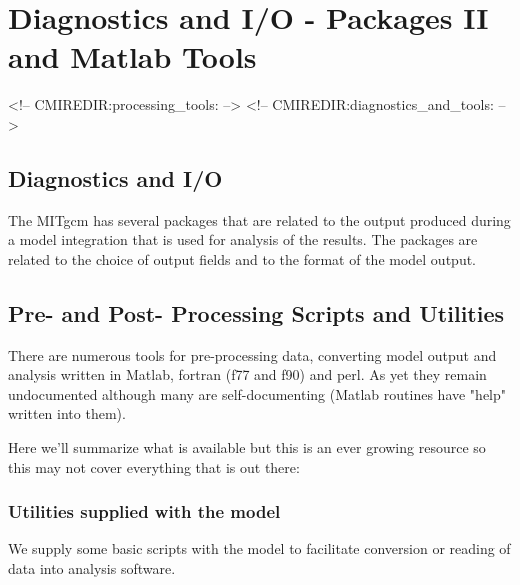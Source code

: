 
\chapter{Diagnostics and I/O - Packages II and Matlab Tools}
\begin{rawhtml}
<!-- CMIREDIR:processing_tools: -->
<!-- CMIREDIR:diagnostics_and_tools: -->
\end{rawhtml}

\section{Diagnostics and I/O}

The MITgcm has several packages that are related to the output
produced during a model integration that is used for analysis
of the results. The packages are related to the choice of output
fields and to the format of the model output.

\newpage


\newpage


\newpage


\newpage


\newpage


\newpage
\section{Pre- and Post- Processing Scripts and Utilities}

There are numerous tools for pre-processing data, converting model
output and analysis written in Matlab, fortran (f77 and f90) and perl.
As yet they remain undocumented although many are self-documenting
(Matlab routines have "help" written into them).

Here we'll summarize what is available but this is an ever growing resource
so this may not cover everything that is out there:

\subsection{Utilities supplied with the model}

We supply some basic scripts with the model to facilitate conversion or reading
of data into analysis software.

